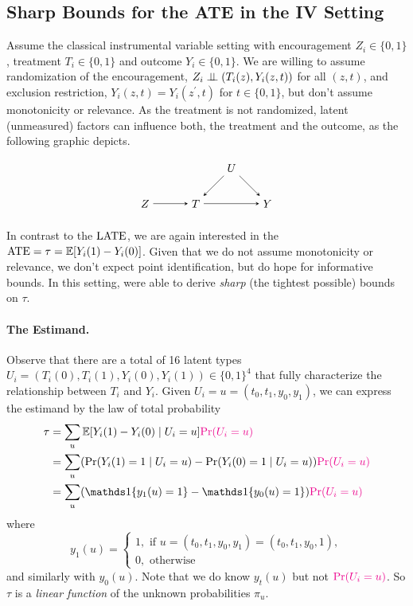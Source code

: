\documentclass[11pt]{exam}
\begin{document}
\subsection{Sharp Bounds for the ATE in the IV Setting}
Assume the classical instrumental variable setting with encouragement $Z_i \in \{0, 1\}$, treatment $T_i \in \{0, 1\}$ and outcome $Y_i \in \{0, 1\}$. We are willing to assume randomization of the encouragement, $Z_i \perp\!\!\!\perp (T_i(z), Y_i(z, t))$ for all $(z, t)$, and exclusion restriction, $Y_i(z, t) = Y_i(z^\prime, t)$ for $t \in \{0, 1\}$, but don't assume monotonicity or relevance. As the treatment is not randomized, latent (unmeasured) factors can influence both, the treatment and the outcome, as the following graphic depicts.

\[
\begin{tikzpicture}[>=stealth, node distance=1.6cm]
  \node (U) {$U$};
  \node[below right of=U] (Y) {$Y$};
  \node[below left of=U] (T) {$T$};
  \node[left of=T] (Z) {$Z$};
  \draw[->] (U) -- (T);
  \draw[->] (U) -- (Y);
  \draw[->] (T) -- (Y);
  \draw[->] (Z) -- (T);
\end{tikzpicture}
\]

In contrast to the $\mathrm{LATE}$, we are again interested in the $\mathrm{ATE} = \tau = \mathbb{E}[Y_i(1) - Y_i(0)]$. Given that we do not assume monotonicity or relevance, we don't expect point identification, but do hope for informative bounds. In this setting, \citet{balke1997bounds} were able to derive \emph{sharp} (the tightest possible) bounds on $\tau$.

\paragraph{The Estimand.}
Observe that there are a total of 16 latent types $U_i = (T_i(0), T_i(1), Y_i(0), Y_i(1)) \in \{0, 1\}^4$ that fully characterize the relationship between $T_i$ and $Y_i$. Given $U_i = u = (t_0, t_1, y_0, y_1)$, we can express the estimand by the law of total probability
\begin{align*}
    \tau &= \sum_{u} \E[Y_i(1) - Y_i(0) \mid U_i = u] \textcolor{magenta}{\Pr(U_i = u)}
    \\
    &= \sum_{u} (\Pr(Y_i(1) = 1 \mid U_i = u) - \Pr(Y_i(0) = 1 \mid U_i = u)) \textcolor{magenta}{\Pr(U_i = u)}
    \\
    &= \sum_{u} (\indicator{y_1(u) = 1}  - \indicator{y_0(u) = 1})\textcolor{magenta}{\Pr(U_i = u)}
\end{align*}
where 
\begin{equation*}
    y_1(u) = \begin{cases}
        1, \text{ if } u = (t_0, t_1, y_0, y_1) = (t_0, t_1, y_0, 1),
        \\
        0, \text{ otherwise}
    \end{cases}
\end{equation*}
and similarly with $y_0(u)$. Note that we do know $y_t(u)$ but not $\textcolor{magenta}{\Pr(U_i = u)}$. So $\tau$ is a \emph{linear function} of the unknown probabilities $\pi_u$.
\end{document}
